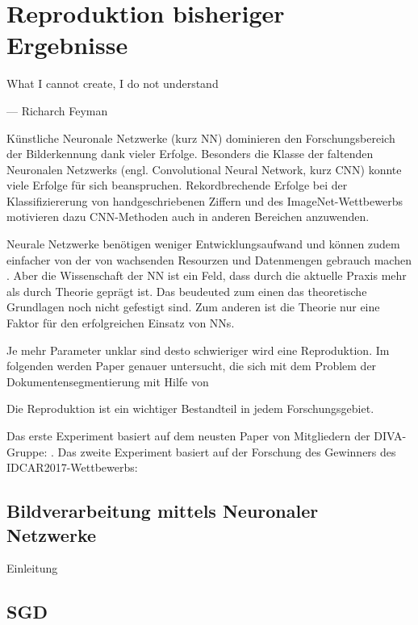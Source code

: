 \chapter{Reproduktion bisheriger Ergebnisse}
\label{chap:reproduktion}
\epigraph{What I cannot create, I do not understand}{--- Richarch Feyman}

Künstliche Neuronale Netzwerke (kurz NN) dominieren den Forschungsbereich der 
Bilderkennung dank vieler Erfolge. 
Besonders die Klasse der faltenden Neuronalen Netzwerks (engl. Convolutional Neural Network, kurz CNN) konnte viele Erfolge für sich beanspruchen.
Rekordbrechende Erfolge bei der Klassifiziererung von handgeschriebenen Ziffern \parencite{LeCunBackpropagationappliedhandwritten1989} und des ImageNet-Wettbewerbs \parencite{KrizhevskyImageNetClassificationDeep2012a} motivieren dazu CNN-Methoden auch in anderen
Bereichen anzuwenden.

Neurale Netzwerke benötigen weniger Entwicklungsaufwand und können zudem einfacher von der 
von wachsenden Resourzen und Datenmengen gebrauch machen \parencite[436]{LeCunDeeplearning2015}. 
Aber die Wissenschaft der NN ist ein Feld, dass durch die aktuelle Praxis mehr als durch Theorie geprägt ist. Das beudeuted zum einen das theoretische Grundlagen noch nicht gefestigt sind.
Zum anderen ist die Theorie nur eine Faktor für den erfolgreichen Einsatz von NNs. 

Je mehr Parameter unklar sind desto schwieriger wird eine Reproduktion.
Im folgenden werden Paper genauer untersucht, die sich mit dem Problem der Dokumentensegmentierung mit Hilfe von 

Die Reproduktion ist ein wichtiger Bestandteil in jedem Forschungsgebiet. 


Das erste Experiment basiert auf dem neusten Paper von Mitgliedern der DIVA-Gruppe: \citeauthor*{ChenConvolutionalNeuralNetworks2017}. 
Das zweite Experiment basiert auf der Forschung des Gewinners des IDCAR2017-Wettbewerbs: \citeauthor*{XuPageSegmentationHistorical2017} 

\section{Bildverarbeitung mittels Neuronaler Netzwerke}
Einleitung \cite{LeCunDeeplearning2015}


\section{SGD}
